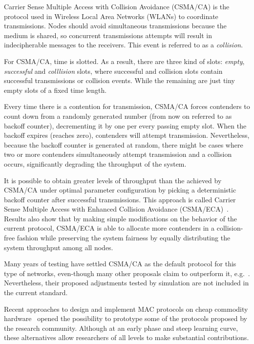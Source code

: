 Carrier Sense Multiple Access with Collision Avoidance (CSMA/CA) is the protocol used in Wireless Local Area Networks (WLANs) to coordinate transmissions. Nodes should avoid simultaneous transmissions because the medium is shared, so concurrent transmissions attempts will result in indecipherable messages to the receivers. This event is referred to as a \emph{collision}. 

For CSMA/CA, time is slotted. As a result, there are three kind of slots: \emph{empty}, \emph{successful} and \emph{colllision} slots, where successful and collision slots contain successful transmissions or collision events. While the remaining are just tiny empty slots of a fixed time length.

Every time there is a contention for transmission, CSMA/CA forces contenders to count down from a randomly generated number (from now on referred to as backoff counter), decrementing it by one per every passing empty slot. When the backoff expires (reaches zero), contenders will attempt transmission. Nevertheless, because the backoff counter is generated at random, there might be cases where two or more contenders simultaneously attempt transmission and a collision occurs, significantly degrading the throughput of the system.

It is possible to obtain greater levels of throughput than the achieved by CSMA/CA under optimal parameter configuration by picking a deterministic backoff counter after successful transmissions. This approach is called Carrier Sense Multiple Access with Enhanced Collision Avoidance (CSMA/ECA)~\cite{CSMA_ECA}. Results also show that by making simple modifications on the behavior of the current protocol, CSMA/ECA is able to allocate more contenders in a collision-free fashion while preserving the system fairness by equally distributing the system throughput among all nodes. 
% 

Many years of testing have settled CSMA/CA as the default protocol for this type of networks, even-though many other proposals claim to outperform it, e.g.~\cite{CSMA_ECA,bellalta2009vtc,L_MAC2,HE,fairness-ECA}. Nevertheless, their proposed adjustments tested by simulation are not included in the current standard.

Recent approaches to design and implement MAC protocols on cheap commodity hardware~\cite{WMP,FLAVIA} opened the possibility to prototype some of the protocols proposed by the research community. Although at an early phase and steep learning curve, these alternatives allow researchers of all levels to make substantial contributions.


